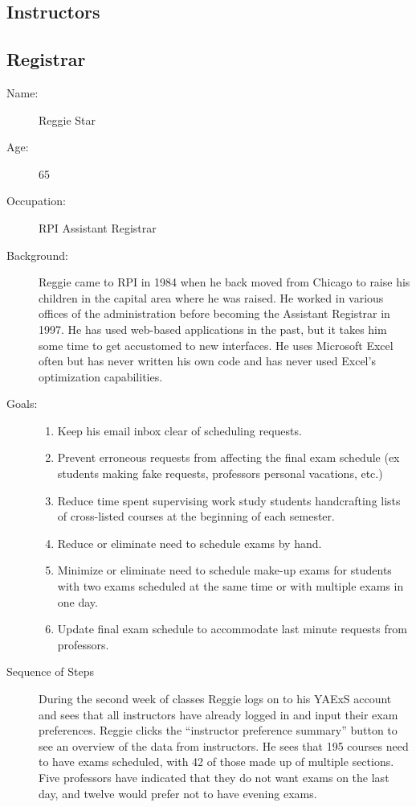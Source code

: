 \documentclass[11pt]{article}
\begin{document}
\subsection{Instructors} %
\subsection{Registrar}  %

\begin{description}
\item[Name:] Reggie Star
\item[Age:]  65
\item[Occupation:] RPI Assistant Registrar
\item[Background:] Reggie came to RPI in 1984 when he  back moved from
 Chicago to raise his children in the capital area where he was raised. 
He worked in various offices of the administration before becoming
 the Assistant Registrar in 1997. 
He has used web-based applications in the past, but it takes him some 
time to get accustomed to new interfaces. 
He uses Microsoft Excel often but has never written his own code
 and has never used Excel’s optimization capabilities.

\item[Goals:]
\begin{enumerate}
\item Keep his email inbox clear of scheduling requests.
\item Prevent erroneous requests from affecting the final exam schedule
 (ex students making fake requests, professors personal vacations, etc.)
\item Reduce time spent supervising work study students handcrafting lists of
 cross-listed courses at the beginning of each semester.
\item Reduce or eliminate need to schedule exams by hand.
\item Minimize or eliminate need to schedule make-up exams for students with
 two exams scheduled at the same time or with multiple exams in one day.
\item Update final exam schedule to accommodate last minute requests 
from professors.
\end{enumerate}

\item[Sequence of Steps]
During the second week of classes Reggie logs on to his YAExS account and
 sees that all instructors have already logged in and input their exam preferences.  
Reggie clicks the “instructor preference summary” button to see an overview of
 the data from instructors. He sees that 195 courses need to have exams
 scheduled, with 42 of those made up of multiple sections. 
Five professors have indicated that they do not want exams on the last day, 
and twelve would prefer not to have evening exams.


\end{description}
\end{document}
